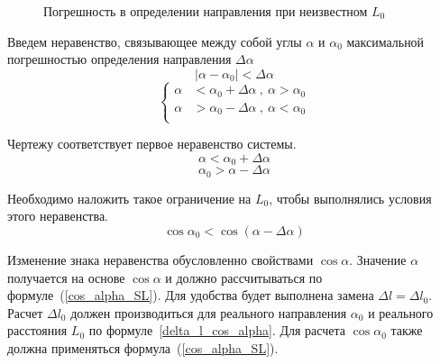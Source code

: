 \documentclass[fleqn,10pt,a4paper]{article}
\begin{document}
\begin{figure}[p]
\label{single_s_src_err}
\caption{Погрешность в определении направления при неизвестном $L_0$}
\end{figure}

Введем неравенство, связывающее между собой углы $\alpha$ и $\alpha_0$
максимальной погрешностью определения направления $\Delta\alpha$
\begin{equation*}
	|\alpha-\alpha_0| < \Delta\alpha
\end{equation*}
\begin{equation*}
	\left\{
		\begin{aligned}
			\alpha &< \alpha_0 + \Delta\alpha~,~\alpha>\alpha_0\\
			\alpha &> \alpha_0 - \Delta\alpha~,~\alpha<\alpha_0\\
		\end{aligned}
	\right.
\end{equation*}

Чертежу соответствует первое неравенство системы.
\begin{equation*}
			\alpha < \alpha_0 + \Delta\alpha
\end{equation*}
\begin{equation*}
			\alpha_0 > \alpha - \Delta\alpha
\end{equation*}

Необходимо наложить такое ограничение на $L_0$, чтобы выполнялись условия этого
неравенства.
\begin{equation*}
	\cos\alpha_0 < \cos\left(\alpha - \Delta\alpha\right)
\end{equation*}

Изменение знака неравенства обусловленно свойствами $\cos\alpha$.
Значение $\alpha$ получается на основе $\cos\alpha$ и должно рассчитываться по
формуле~(\ref{cos_alpha_SL}). Для удобства будет выполнена замена 
$\Delta{}l=\Delta{}l_0$. Расчет $\Delta{}l_0$ должен производиться для 
реального направления $\alpha_0$ и реального расстояния $L_0$ по 
формуле~\ref{delta_l_cos_alpha}. Для расчета $\cos\alpha_0$ также должна
применяться формула~(\ref{cos_alpha_SL}).
\end{document}
